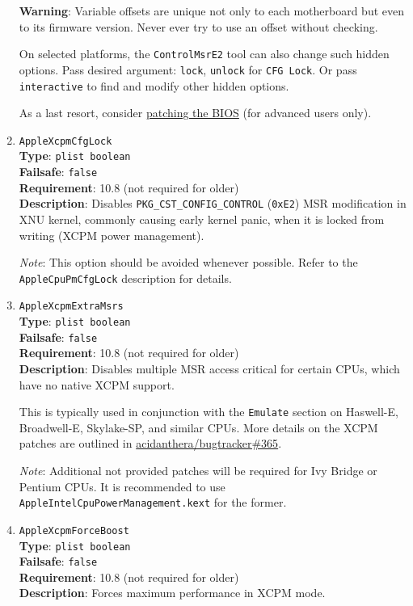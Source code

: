 \documentclass[]{article}
\begin{document}
\begin{enumerate}
  \textbf{Warning}: Variable offsets are unique not only to each motherboard but even to its firmware
  version. Never ever try to use an offset without checking.

  On selected platforms, the \texttt{ControlMsrE2} tool can also change such
  hidden options. Pass desired argument: \texttt{lock}, \texttt{unlock} for
  \texttt{CFG Lock}. Or pass \texttt{interactive} to find and modify other
  hidden options.

  As a last resort, consider
  \href{https://github.com/LongSoft/UEFITool/blob/master/UEFIPatch/patches.txt}{patching the BIOS}
  (for advanced users only).

\item
  \texttt{AppleXcpmCfgLock}\\
  \textbf{Type}: \texttt{plist\ boolean}\\
  \textbf{Failsafe}: \texttt{false}\\
  \textbf{Requirement}: 10.8 (not required for older)\\
  \textbf{Description}: Disables \texttt{PKG\_CST\_CONFIG\_CONTROL} (\texttt{0xE2})
  MSR modification in XNU kernel, commonly causing early kernel panic, when it is
  locked from writing (XCPM power management).

  \emph{Note}: This option should be avoided whenever possible.
  Refer to the \texttt{AppleCpuPmCfgLock} description for details.

\item
  \texttt{AppleXcpmExtraMsrs}\\
  \textbf{Type}: \texttt{plist\ boolean}\\
  \textbf{Failsafe}: \texttt{false}\\
  \textbf{Requirement}: 10.8 (not required for older)\\
  \textbf{Description}: Disables multiple MSR access critical for certain CPUs,
  which have no native XCPM support.

  This is typically used in conjunction with the \texttt{Emulate} section on Haswell-E,
  Broadwell-E, Skylake-SP, and similar CPUs. More details on the XCPM patches are outlined in
  \href{https://github.com/acidanthera/bugtracker/issues/365}{acidanthera/bugtracker\#365}.

  \emph{Note}: Additional not provided patches will be required for Ivy Bridge or Pentium
  CPUs. It is recommended to use \texttt{AppleIntelCpuPowerManagement.kext} for the former.

\item
  \texttt{AppleXcpmForceBoost}\\
  \textbf{Type}: \texttt{plist\ boolean}\\
  \textbf{Failsafe}: \texttt{false}\\
  \textbf{Requirement}: 10.8 (not required for older)\\
  \textbf{Description}: Forces maximum performance in XCPM mode.


\end{enumerate}
\end{document}
